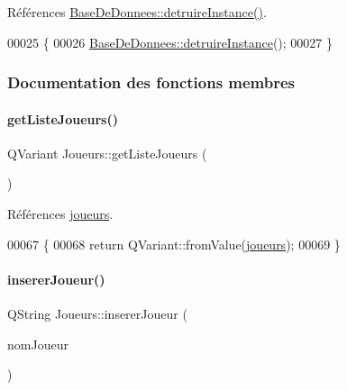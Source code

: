 Références \hyperlink{class_base_de_donnees_a457401c0816b888c77ce915997545f4e}{Base\+De\+Donnees\+::detruire\+Instance()}.


\begin{DoxyCode}
00025 \{
00026     \hyperlink{class_base_de_donnees_a457401c0816b888c77ce915997545f4e}{BaseDeDonnees::detruireInstance}();
00027 \}
\end{DoxyCode}


\subsubsection{Documentation des fonctions membres}
\mbox{\label{class_joueurs_aec63d4e2fe1bf7fbf33489c1a8d3bbbf}} 
\paragraph{\texorpdfstring{get\+Liste\+Joueurs()}{getListeJoueurs()}}
{\footnotesize\ttfamily Q\+Variant Joueurs\+::get\+Liste\+Joueurs (\begin{DoxyParamCaption}{ }\end{DoxyParamCaption})}



Références \hyperlink{class_joueurs_a86c2a21b5a6b83f9a43f9a957a020fd7}{joueurs}.


\begin{DoxyCode}
00067 \{
00068     \textcolor{keywordflow}{return} QVariant::fromValue(\hyperlink{class_joueurs_a86c2a21b5a6b83f9a43f9a957a020fd7}{joueurs});
00069 \}
\end{DoxyCode}
\mbox{\label{class_joueurs_ad41325dbd0611773c6e9fd8a814be1b3}} 
\paragraph{\texorpdfstring{inserer\+Joueur()}{insererJoueur()}}
{\footnotesize\ttfamily Q\+String Joueurs\+::inserer\+Joueur (\begin{DoxyParamCaption}\item[{Q\+String}]{nom\+Joueur }\end{DoxyParamCaption})}



